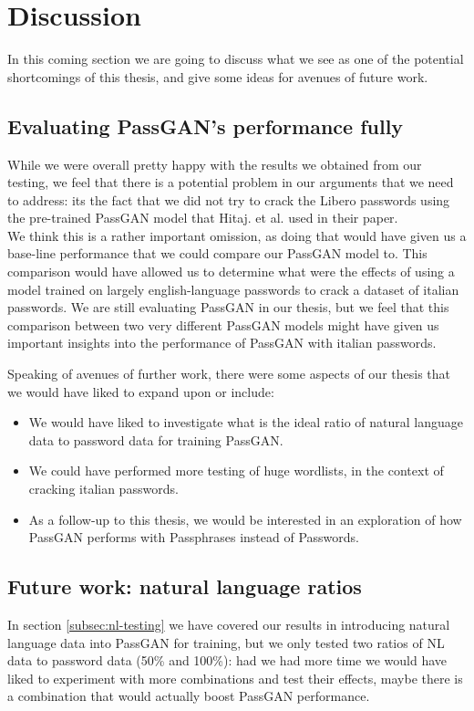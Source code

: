 \section{Discussion}\label{sec:discussion}

In this coming section we are going to discuss what we see as one of the potential shortcomings of this thesis, and give some ideas for avenues of future work.

\subsection{Evaluating PassGAN's performance fully}
While we were overall pretty happy with the results we obtained from our testing, we feel that there is a potential problem in our arguments that we need to address: its the fact that we did not try to crack the Libero passwords using the pre-trained PassGAN model that Hitaj. et al. \cite{PassGAN} used in their paper. \\ 
We think this is a rather important omission, as doing that would have given us a base-line performance that we could compare our PassGAN model to.  This comparison would have allowed us to determine what were the effects of using a model trained on largely english-language passwords to crack a dataset of italian passwords. We are still evaluating PassGAN in our thesis, but we feel that this comparison between two very different PassGAN models might have given us important insights into the performance of PassGAN with italian passwords.

Speaking of avenues of further work, there were some aspects of our thesis that we would have liked to expand upon or include: 
\begin{itemize}
\item We would have liked to investigate what is the ideal ratio of natural language data to password data for training PassGAN.
\item We could have performed more testing of huge wordlists, in the context of cracking italian passwords.
\item As a follow-up to this thesis, we would be interested in an exploration of how PassGAN performs with Passphrases instead of Passwords.
\end{itemize}

\subsection{Future work: natural language ratios}
In section \ref{subsec:nl-testing} we have covered our results in introducing natural language data into PassGAN for training, but we only tested two ratios of NL data to password data (50\% and 100\%): had we had more time we would have liked to experiment with more combinations and test their effects, maybe there is a combination that would actually boost PassGAN performance.

